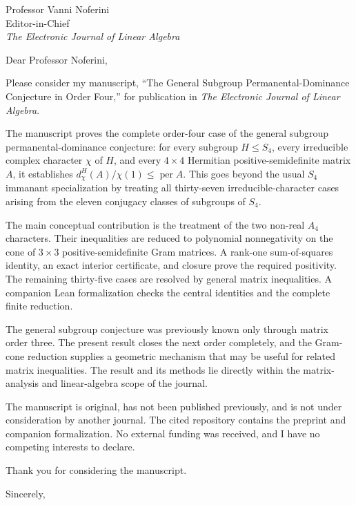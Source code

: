 \documentclass[10pt]{letter}
\date{21 August 2026}
\begin{document}
\begin{letter}{Professor Vanni Noferini\\
Editor-in-Chief\\
\textit{The Electronic Journal of Linear Algebra}}

\opening{Dear Professor Noferini,}

Please consider my manuscript, ``The General Subgroup
Permanental-Dominance Conjecture in Order Four,'' for publication in
\textit{The Electronic Journal of Linear Algebra}.

The manuscript proves the complete order-four case of the general subgroup
permanental-dominance conjecture: for every subgroup $H\leq S_4$, every
irreducible complex character $\chi$ of $H$, and every $4\times4$ Hermitian
positive-semidefinite matrix $A$, it establishes
$d_\chi^H(A)/\chi(1)\leq \operatorname{per} A$.  This goes beyond the usual
$S_4$ immanant specialization by treating all thirty-seven
irreducible-character cases arising from the eleven conjugacy classes of
subgroups of $S_4$.

The main conceptual contribution is the treatment of the two non-real
$A_4$ characters.  Their inequalities are reduced to polynomial
nonnegativity on the cone of $3\times3$ positive-semidefinite Gram matrices.
A rank-one sum-of-squares identity, an exact interior certificate, and
closure prove the required positivity.  The remaining thirty-five cases are
resolved by general matrix inequalities.  A companion Lean formalization
checks the central identities and the complete finite reduction.

The general subgroup conjecture was previously known only through matrix
order three.  The present result closes the next order completely, and the
Gram-cone reduction supplies a geometric mechanism that may be useful for
related matrix inequalities.  The result and its methods lie directly within
the matrix-analysis and linear-algebra scope of the journal.

The manuscript is original, has not been published previously, and is not
under consideration by another journal.  The cited repository contains the
preprint and companion formalization.  No external funding was received, and
I have no competing interests to declare.

Thank you for considering the manuscript.

\closing{Sincerely,}

\end{letter}
\end{document}
